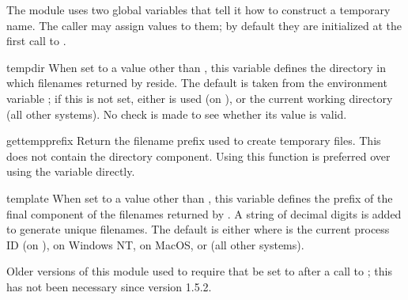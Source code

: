 The module uses two global variables that tell it how to construct a
temporary name.  The caller may assign values to them; by default they
are initialized at the first call to .

\begin{datadesc}{tempdir}
When set to a value other than , this variable defines the
directory in which filenames returned by  reside.
The default is taken from the environment variable ; if
this is not set, either  is used (on \UNIX{}), or the
current working directory (all other systems).  No check is made to
see whether its value is valid.
\end{datadesc}

\begin{funcdesc}{gettempprefix}{}
Return the filename prefix used to create temporary files.  This does
not contain the directory component.  Using this function is preferred
over using the  variable directly.
\end{funcdesc}

\begin{datadesc}{template}
When set to a value other than , this variable defines the
prefix of the final component of the filenames returned by
.  A string of decimal digits is added to generate
unique filenames.  The default is either  where
 is the current process ID (on \UNIX{}),
 on Windows NT,  on
MacOS, or  (all other systems).

Older versions of this module used to require that  be
set to  after a call to ; this has not
been necessary since version 1.5.2.
\end{datadesc}
